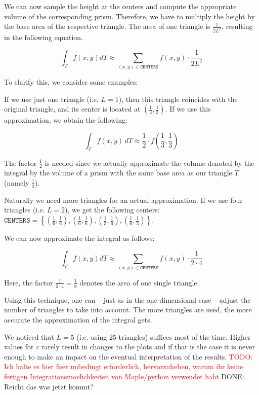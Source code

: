 \documentclass{article}
\newcommand{\todo}[2][]{\textcolor{red}{TODO\ifthenelse{\equal{#1}{}}{}{[#1]}: #2}}
\newcommand{\done}[2][]{\textcolor{green!50!black}{DONE\ifthenelse{\equal{#1}{}}{}{[#1]}: #2}}
\begin{document}
We can now sample the height at the centers and compute the appropriate volume of the corresponding prism. Therefore, we have to multiply the height by the base area of the respective triangle. The area of one triangle is $\frac{1}{2 L^2}$, resulting in the following equation.

\begin{equation}
  \int_T f(x,y) dT \approx \sum_{(x,y)\in\mathtt{CENTERS}} f(x,y) \cdot \frac{1}{2L^2}
\end{equation}

To clarify this, we consider some examples:

If we use just one triangle (i.e. $L=1$), then this triangle coincides with the original triangle, and its center is located at $(\frac{1}{3}, \frac{1}{3})$. If we use this approximation, we obtain the following:

\begin{equation*}
  \int_T f(x,y)\, dT \approx \frac{1}{2} \cdot f(\frac{1}{3},\frac{1}{3})
\end{equation*}

The factor $\frac{1}{2}$ is needed since we actually approximate the volume denoted by the integral by the volume of a prism with the same base area as our triangle $T$ (namely $\frac{1}{2}$).

Naturally we need more triangles for an actual approximation. If we use four triangles (i.e. $L=2$), we get the following centers: $\mathtt{CENTERS} = \left\{ (\frac{1}{6}, \frac{1}{6}), (\frac{1}{6}, \frac{1}{6}), (\frac{1}{3}, \frac{1}{6}), (\frac{1}{6},\frac{1}{3}) \right\}$.

We can now approximate the integral as follows:

\begin{equation*}
  \int_T f(x,y) dT \approx \sum_{(x,y)\in\mathtt{CENTERS}} f(x,y)\cdot \frac{1}{2\cdot 4}
\end{equation*}

Here, the factor $\frac{1}{2\cdot 4}= \frac{1}{8}$ denotes the area of one single triangle.

Using this technique, one can -- just as in the one-dimensional case -- adjust the number of triangles to take into account. The more triangles are used, the more accurate the approximation of the integral gets.

We noticed that $L=5$ (i.e. using 25 triangles) suffices most of the time. Higher values for $r$ rarely result in changes to the plots and if that is the case it is never enough to make an impact on the eventual interpretation of the results.
\todo{Ich halte es hier fuer unbedingt erforderlich, hervorzuheben, warum ihr keine fertigen Integrationsmoelichkeiten von Maple/python verwendet habt.}\done{Reicht das was jetzt kommt?}
\end{document}
